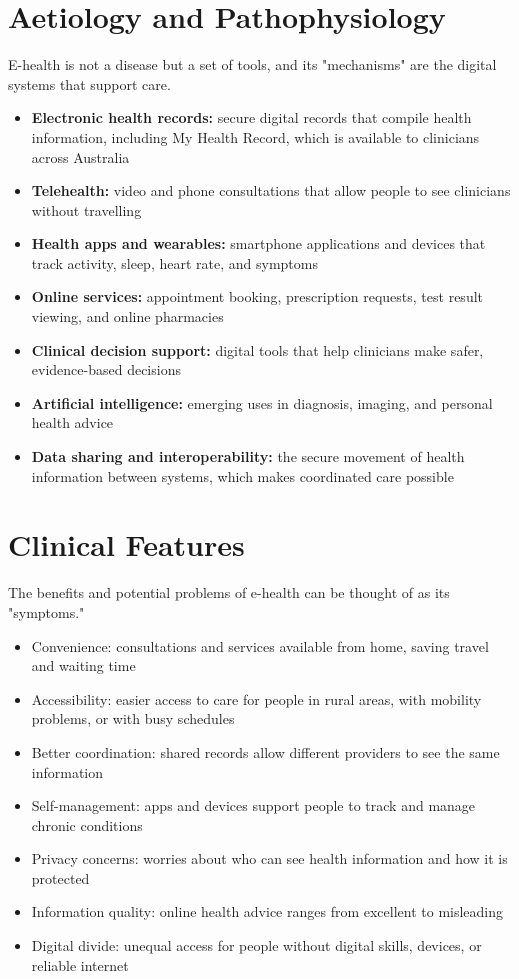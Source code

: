 \section*{Aetiology and Pathophysiology}
E-health is not a disease but a set of tools, and its "mechanisms" are the digital systems that support care.
\begin{itemize}
    \item \textbf{Electronic health records:} secure digital records that compile health information, including My Health Record, which is available to clinicians across Australia
    \item \textbf{Telehealth:} video and phone consultations that allow people to see clinicians without travelling
    \item \textbf{Health apps and wearables:} smartphone applications and devices that track activity, sleep, heart rate, and symptoms
    \item \textbf{Online services:} appointment booking, prescription requests, test result viewing, and online pharmacies
    \item \textbf{Clinical decision support:} digital tools that help clinicians make safer, evidence-based decisions
    \item \textbf{Artificial intelligence:} emerging uses in diagnosis, imaging, and personal health advice
    \item \textbf{Data sharing and interoperability:} the secure movement of health information between systems, which makes coordinated care possible
\end{itemize}

\section*{Clinical Features}
The benefits and potential problems of e-health can be thought of as its "symptoms."
\begin{itemize}
    \item Convenience: consultations and services available from home, saving travel and waiting time
    \item Accessibility: easier access to care for people in rural areas, with mobility problems, or with busy schedules
    \item Better coordination: shared records allow different providers to see the same information
    \item Self-management: apps and devices support people to track and manage chronic conditions
    \item Privacy concerns: worries about who can see health information and how it is protected
    \item Information quality: online health advice ranges from excellent to misleading
    \item Digital divide: unequal access for people without digital skills, devices, or reliable internet
\end{itemize}

